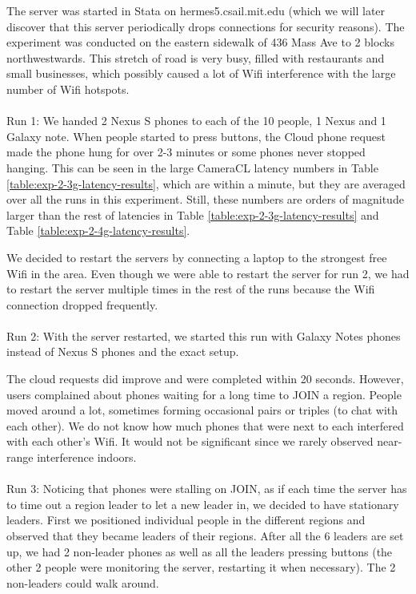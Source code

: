 The server was started in Stata on hermes5.csail.mit.edu (which we will later discover that this server periodically drops connections for security reasons). The experiment was conducted on the eastern sidewalk of 436 Mass Ave to 2 blocks northwestwards. This stretch of road is very busy, filled with restaurants and small businesses, which possibly caused a lot of Wifi interference with the large number of Wifi hotspots.
\\
\\
Run 1:
We handed 2 Nexus S phones to each of the 10 people, 1 Nexus and 1 Galaxy note. When people started to press buttons, the Cloud phone request made the phone hung for over 2-3 minutes or some phones never stopped hanging. This can be seen in the large CameraCL latency numbers in Table \ref{table:exp-2-3g-latency-results}, which are within a minute, but they are averaged over all the runs in this experiment. Still, these numbers are orders of magnitude larger than the rest of latencies in Table \ref{table:exp-2-3g-latency-results} and Table \ref{table:exp-2-4g-latency-results}. 

We decided to restart the servers by connecting a laptop to the strongest free Wifi in the area. Even though we were able to restart the server for run 2, we had to restart the server multiple times in the rest of the runs because the Wifi connection dropped frequently.
\\
\\
Run 2:
With the server restarted, we started this run with Galaxy Notes phones instead of Nexus S phones and the exact setup.

The cloud requests did improve and were completed within 20 seconds. However, users complained about phones waiting for a long time to JOIN a region.  People moved around a lot, sometimes forming occasional pairs or triples (to chat with each other). We do not know how much phones that were next to each interfered with each other's Wifi. It would not be significant since we rarely observed near-range interference indoors. 
\\
\\
Run 3:
Noticing that phones were stalling on JOIN, as if each time the server has to time out a region leader to let a new leader in, we decided to have stationary leaders. First we positioned individual people in the different regions and observed that they became leaders of their regions. After all the 6 leaders are set up, we had 2 non-leader phones as well as all the leaders pressing buttons (the other 2 people were monitoring the server, restarting it when necessary). The 2 non-leaders could walk around. 

